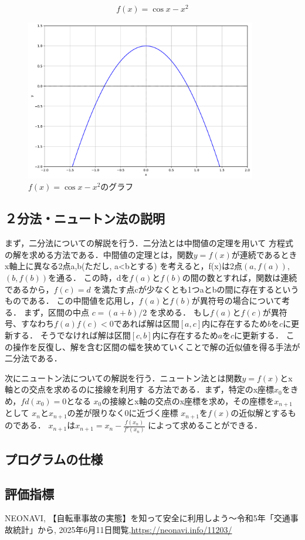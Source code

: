 \documentclass[uplatex]{jsarticle}
\begin{document}
\begin{equation}
f(x)=\cos x- x^2\label{eq:fx}
\end{equation}

\begin{figure}[H]
    \centering
    \includegraphics[width=0.9\textwidth]{class_technical_report-main_shiozawaChange/func_graph.pdf}
    \caption{$f(x)=\cos x- x^2$のグラフ}
    \label{fig:func}
\end{figure}


\subsection{２分法・ニュートン法の説明}

まず，二分法についての解説を行う．二分法とは中間値の定理を用いて
方程式の解を求める方法である．中間値の定理とは，関数$y=f(x)$が連続であるとき
x軸上に異なる2点a,b(ただし, a<bとする)
を考えると，f(x)は2点$(a,f(a))$, $(b,f(b))$を通る．
この時，dを$f(a)$と$f(b)$の間の数とすれば，関数は連続であるから，$f(c)=d$
を満たす点cが少なくとも1つaとbの間に存在するというものである．
この中間値を応用し，$f(a)$と$f(b)$が異符号の場合について考る．
まず，区間の中点 $c = (a+b)/2$ を求める．
もし$f(a)$と$f(c)$が異符号、すなわち$f(a)f(c)<0$であれば解は区間$[a,c]$内に存在するため$b$を$c$に更新する．
そうでなければ解は区間$[c,b]$内に存在するため$a$を$c$に更新する．
この操作を反復し、解を含む区間の幅を狭めていくことで解の近似値を得る手法が二分法である．


次にニュートン法についての解説を行う．ニュートン法とは関数$y=f(x)$とx軸との交点を求めるのに接線を利用す
る方法である．まず，特定のx座標$x_0$をきめ，$fd(x_0)=0$となる
$x_0$の接線とx軸の交点のx座標を求め，その座標を$x_{n+1}$として
$x_n$と$x_{n+1}$の差が限りなく0に近づく座標
$x_{n+1}$を$f(x)$の近似解とするものである．
$x_{n+1}$は$x_{n+1} = x_n - \frac{f(x_n)}{f'(x_n)}$
によって求めることができる．



\subsection{プログラムの仕様}

\subsection{評価指標}


\begin{thebibliography}{11}

 NEONAVI, 【自転車事故の実態】を知って安全に利用しよう～令和5年「交通事故統計」から, 
2025年6月11日閲覧,\url{https://neonavi.info/11203/}
\end{thebibliography}
\end{document}
